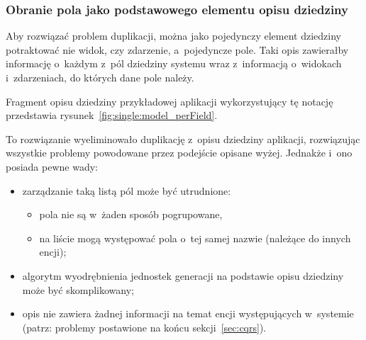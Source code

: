 %
%
%
%
%

\subsubsection{Obranie pola jako podstawowego elementu opisu dziedziny}

Aby rozwiązać problem duplikacji, można jako pojedynczy element dziedziny potraktować nie widok, czy zdarzenie, a~pojedyncze pole.
Taki opis zawierałby informację o~każdym z~pól dziedziny systemu wraz z~informacją o~widokach i~zdarzeniach, do których dane pole należy.

Fragment opisu dziedziny przykładowej aplikacji wykorzystujący tę notację przedstawia rysunek~\ref{fig:single:model_perField}.



To rozwiązanie wyeliminowało duplikację z~opisu dziedziny aplikacji, rozwiązując wszystkie problemy powodowane przez podejście opisane wyżej.
Jednakże i~ono posiada pewne wady:

\begin{itemize}
 \item zarządzanie taką listą pól może być utrudnione:
  \begin{itemize}
   \item pola nie są w~żaden sposób pogrupowane,
   \item na liście mogą występować pola o~tej samej nazwie (należące do innych encji);
  \end{itemize}
 \item algorytm wyodrębnienia jednostek generacji na podstawie opisu dziedziny może być skomplikowany;
 \item opis nie zawiera żadnej informacji na temat encji występujących w~systemie (patrz: problemy postawione na końcu sekcji~\ref{sec:cqrs}).
\end{itemize}

